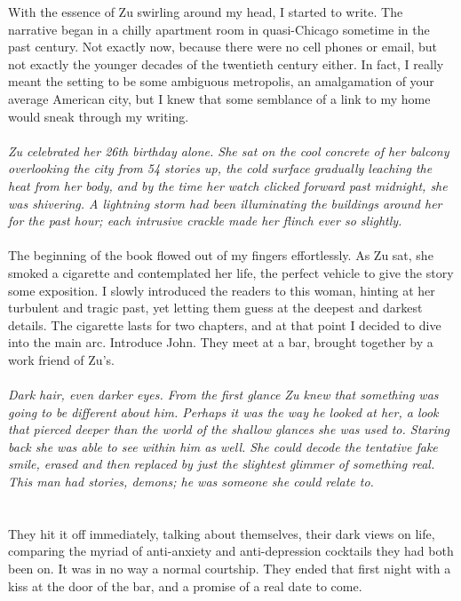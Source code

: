 \documentclass[12pt,oneside,openany]{memoir}
\begin{document}
With the essence of Zu swirling around my head, I started to write. The narrative began in a chilly apartment room in quasi-Chicago sometime in the past century. Not exactly now, because there were no cell phones or email, but not exactly the younger decades of the twentieth century either.  In fact, I really meant the setting to be some ambiguous metropolis, an amalgamation of your average American city, but I knew that some semblance of a link to my home would sneak through my writing.
\\\\
\indent\textit{Zu celebrated her 26th birthday alone. She sat on the cool concrete of her balcony overlooking the city from 54 stories up, the cold surface gradually leaching the heat from her body, and by the time her watch clicked forward past midnight, she was shivering. A lightning storm had been illuminating the buildings around her for the past hour; each intrusive crackle made her flinch ever so slightly.}
\\\\
\indent The beginning of the book flowed out of my fingers effortlessly. As Zu sat, she smoked a cigarette and contemplated her life, the perfect vehicle to give the story some exposition. I slowly introduced the readers to this woman, hinting at her turbulent and tragic past, yet letting them guess at the deepest and darkest details. The cigarette lasts for two chapters, and at that point I decided to dive into the main arc. Introduce John. They meet at a bar, brought together by a work friend of Zu’s.
\\\\	
\indent\textit{	Dark hair, even darker eyes. From the first glance Zu knew that something was going to be different about him. Perhaps it was the way he looked at her, a look that pierced deeper than the world of the shallow glances she was used to. Staring back she was able to see within him as well. She could decode the tentative fake smile, erased and then replaced by just the slightest glimmer of something real. This man had stories, demons; he was someone she could relate to.}
\\\\	\\
\indent They hit it off immediately, talking about themselves, their dark views on life, comparing the myriad of anti-anxiety and anti-depression cocktails they had both been on. It was in no way a normal courtship. They ended that first night with a kiss at the door of the bar, and a promise of a real date to come. 
\end{document}

